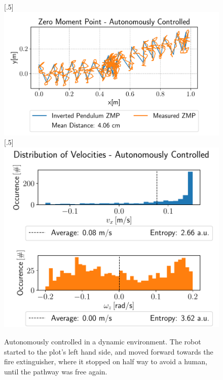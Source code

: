 \begin{figure}[h!]
	[.5\linewidth]{\includegraphics[scale=.45]{chapters/04_experiments/02_autonomous_walking/dynamic_walk_01_zmp.pdf}}
	[.5\linewidth]{\includegraphics[scale=.45]{chapters/04_experiments/02_autonomous_walking/dynamic_walk_01_entropy.pdf}}
	\caption{Autonomously controlled in a dynamic environment. The robot started to the plot's left hand side, and moved forward towards the fire extinguisher, where it stopped on half way to avoid a human, until the pathway was free again.}
	\label{fig::424_aw_additional_dynamic}
\end{figure}
